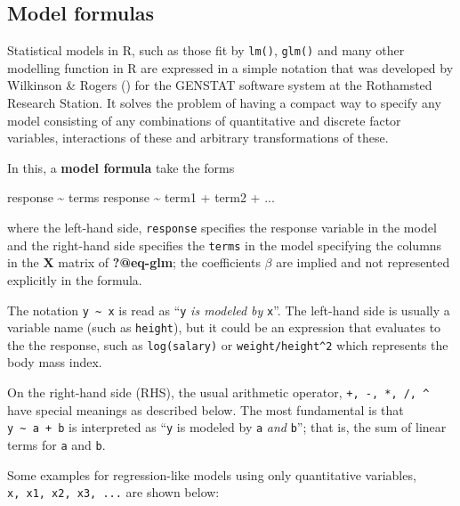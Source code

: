 \documentclass[
  letterpaper,
  10pt,
  krantz2]{krantz}
\makeatletter
\newenvironment{Shaded}{\begin{snugshade}}{\end{snugshade}}
\newcommand{\NormalTok}[1]{\textcolor[rgb]{0.00,0.23,0.31}{#1}}
\newcommand{\SpecialCharTok}[1]{\textcolor[rgb]{0.37,0.37,0.37}{#1}}
\newenvironment{kframe}{%
  \medskip{}
  \setlength{\fboxsep}{.8em}
  \def\at@end@of@kframe{}%
  \ifinner\ifhmode%
  \def\at@end@of@kframe{\end{minipage}}%
  \begin{minipage}{\columnwidth}%
  \fi\fi%
  \def\FrameCommand##1{\hskip\@totalleftmargin \hskip-\fboxsep
  \colorbox{shadecolor}{##1}\hskip-\fboxsep
      \hskip-\linewidth \hskip-\@totalleftmargin \hskip\columnwidth}%
  \MakeFramed {\advance\hsize-\width
    \@totalleftmargin\z@ \linewidth\hsize
    \@setminipage}}%
{\par\unskip\endMakeFramed%
  \at@end@of@kframe}
\renewenvironment{Shaded}{\begin{kframe}}{\end{kframe}}
\makeatother
\begin{document}
\subsection{Model formulas}\label{sec-model-formulas}

Statistical models in R, such as those fit by \texttt{lm()},
\texttt{glm()} and many other modelling function in R are expressed in a
simple notation that was developed by Wilkinson \& Rogers
() for the GENSTAT software
system at the Rothamsted Research Station. It solves the problem of
having a compact way to specify any model consisting of any combinations
of quantitative and discrete factor variables, interactions of these and
arbitrary transformations of these.

In this, a \textbf{model formula} take the forms

\begin{Shaded}
\begin{Highlighting}[]
\NormalTok{response }\SpecialCharTok{\textasciitilde{}}\NormalTok{ terms}
\NormalTok{response }\SpecialCharTok{\textasciitilde{}}\NormalTok{ term1 }\SpecialCharTok{+}\NormalTok{ term2 }\SpecialCharTok{+}\NormalTok{ ...}
\end{Highlighting}
\end{Shaded}

where the left-hand side, \texttt{response} specifies the response
variable in the model and the right-hand side specifies the
\texttt{terms} in the model specifying the columns in the \(\mathbf{X}\)
matrix of \textbf{?@eq-glm}; the coefficients \(\beta\) are implied and
not represented explicitly in the formula.

The notation \texttt{y\ \textasciitilde{}\ x} is read as ``\texttt{y}
\emph{is modeled by} \texttt{x}''. The left-hand side is usually a
variable name (such as \texttt{height}), but it could be an expression
that evaluates to the the response, such as \texttt{log(salary)} or
\texttt{weight/height\^{}2} which represents the body mass index.

On the right-hand side (RHS), the usual arithmetic operator,
\texttt{+,\ -,\ *,\ /,\ \^{}} have special meanings as described below.
The most fundamental is that \texttt{y\ \textasciitilde{}\ a\ +\ b} is
interpreted as ``\texttt{y} is modeled by \texttt{a} \emph{and}
\texttt{b}''; that is, the sum of linear terms for \texttt{a} and
\texttt{b}.

Some examples for regression-like models using only quantitative
variables, \texttt{x,\ x1,\ x2,\ x3,\ ...} are shown below:
\end{document}
